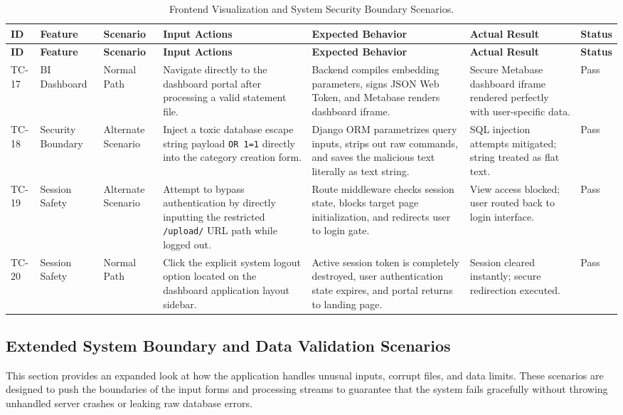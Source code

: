 \begingroup
\setlength{\tabcolsep}{3pt}
\renewcommand{\arraystretch}{1.3}
\begin{longtable}{|p{0.9cm}|>{\raggedright\arraybackslash}p{1.7cm}|>{\raggedright\arraybackslash}p{1.5cm}|>{\raggedright\arraybackslash}p{3.3cm}|>{\raggedright\arraybackslash}p{3.3cm}|>{\raggedright\arraybackslash}p{1.9cm}|>{\raggedright\arraybackslash}p{1.2cm}|}
	\caption{Frontend Visualization and System Security Boundary Scenarios.}
	\label{tab:tc_security}\\
	\hline
	\textbf{ID} & \textbf{Feature} & \textbf{Scenario} & \textbf{Input Actions} & \textbf{Expected Behavior} & \textbf{Actual Result} & \textbf{Status} \\ \hline
	\endfirsthead
	\hline
	\textbf{ID} & \textbf{Feature} & \textbf{Scenario} & \textbf{Input Actions} & \textbf{Expected Behavior} & \textbf{Actual Result} & \textbf{Status} \\ \hline
	\endhead
	TC-17 & BI Dashboard & Normal Path & Navigate directly to the dashboard portal after processing a valid statement file. & Backend compiles embedding parameters, signs JSON Web Token, and Metabase renders dashboard iframe. & Secure Metabase dashboard iframe rendered perfectly with user-specific data. & Pass \\ \hline
	TC-18 & Security Boundary & Alternate Scenario & Inject a toxic database escape string payload \texttt{OR 1=1} directly into the category creation form. & Django ORM parametrizes query inputs, strips out raw commands, and saves the malicious text literally as text string. & SQL injection attempts mitigated; string treated as flat text. & Pass \\ \hline
	TC-19 & Session Safety & Alternate Scenario & Attempt to bypass authentication by directly inputting the restricted \texttt{/upload/} URL path while logged out. & Route middleware checks session state, blocks target page initialization, and redirects user to login gate. & View access blocked; user routed back to login interface. & Pass \\ \hline
	TC-20 & Session Safety & Normal Path & Click the explicit system logout option located on the dashboard application layout sidebar. & Active session token is completely destroyed, user authentication state expires, and portal returns to landing page. & Session cleared instantly; secure redirection executed. & Pass \\ \hline
\end{longtable}
\endgroup

\subsection{Extended System Boundary and Data Validation Scenarios}
This section provides an expanded look at how the application handles unusual inputs, corrupt files, and data limits. These scenarios are designed to push the boundaries of the input forms and processing streams to guarantee that the system fails gracefully without throwing unhandled server crashes or leaking raw database errors.

